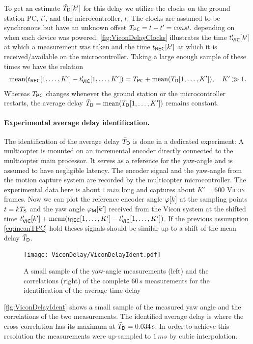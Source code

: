 To get an estimate $\hat{T}_{\mathsf{D}}[k']$ for this delay we utilize the clocks on the ground station PC, $t'$, and the microcontroller, $t$.
The clocks are assumed to be synchronous but have an unknown offset $T_{\mathsf{PC}} = t - t' = const.$ depending on when each device was powered.
\autoref{fig:ViconDelayClocks} illustrates the time $t_{\mathsf{VIC}}'[k']$ at which a measurement was taken and the time $t_{\mathsf{REC}}[k']$ at which it is received/available on the microcontroller.
Taking a large enough sample of these times we have the relation
\begin{align}\label{eq:meanTPC}
 \text{mean} (t_{\mathsf{REC}}[1,\ldots,K'] - t_{\mathsf{VIC}}'[1,\ldots,K']) = T_{\mathsf{PC}} + \text{mean}(T_{\mathsf{D}}[1,\ldots,K']), \quad K'\gg 1.
\end{align}
Whereas $T_{\mathsf{PC}}$ changes whenever the ground station or the microcontroller restarts, the average delay $\bar{T}_{\mathsf{D}} = \text{mean}(T_{\mathsf{D}}[1,\ldots,K'])$ remains constant.

\paragraph{Experimental average delay identification.}
The identification of the average delay $\bar{T}_{\mathsf{D}}$ is done in a dedicated experiment:
A multicopter is mounted on an incremental encoder directly connected to the multicopter main processor.
It serves as a reference for the yaw-angle and is assumed to have negligible latency.
The encoder signal and the yaw-angle from the motion capture system are recorded by the multicopter microcontroller.
The experimental data here is about $1\,\unit{min}$ long and captures about $K' = 600$ \textsc{Vicon} frames.
Now we can plot the reference encoder angle $\varphi[k]$ at the sampling points $t = kT_{\mathrm{S}}$ and the yaw angle $\varphi_{\mathsf{M}}[k']$ received from the Vicon system at the shifted time $t_{\mathsf{VIC}}'[k'] + \text{mean}(t_{\mathsf{REC}}[1,\ldots,K'] - t_{\mathsf{VIC}}'[1,\ldots,K'])$.
If the previous assumption \eqref{eq:meanTPC} hold theses signals should be similar up to a shift of the mean delay $\bar{T}_{\mathsf{D}}$.

\begin{figure}[ht]
 \centering
 \texttt{[image: ViconDelay/ViconDelayIdent.pdf]}
 \caption{A small sample of the yaw-angle measurements (left) and the correlations (right) of the complete $60\,\unit{s}$ measurements for the identification of the average time delay}
 \label{fig:ViconDelayIdent}
\end{figure}

\autoref{fig:ViconDelayIdent} shows a small sample of the measured yaw angle and the correlations of the two measurements.
The identified average delay is where the cross-correlation has its maximum at $\bar{T}_{\mathsf{D}} = 0.034\,\text{s}$.
In order to achieve this resolution the measurements were up-sampled to $1\,\unit{ms}$ by cubic interpolation.


